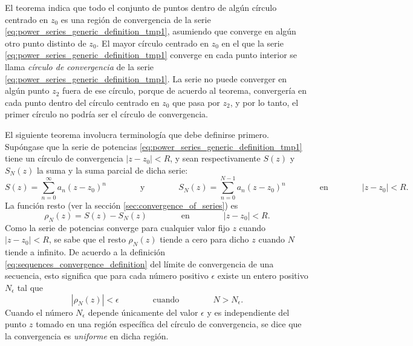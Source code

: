 \documentclass[a4paper]{report}
\begin{document}
El teorema indica que todo el conjunto de puntos dentro de algún círculo centrado en \(z_0\) es una región de convergencia de la serie \ref{eq:power_series_generic_definition_tmp1}, asumiendo que converge en algún otro punto distinto de \(z_0\). El mayor círculo centrado en \(z_0\) en el que la serie \ref{eq:power_series_generic_definition_tmp1} converge en cada punto interior se llama \emph{círculo de convergencia} de la serie \ref{eq:power_series_generic_definition_tmp1}. La serie no puede converger en algún punto \(z_2\) fuera de ese círculo, porque de acuerdo al teorema, convergería en cada punto dentro del círculo centrado en \(z_0\) que pasa por \(z_2\), y por lo tanto, el primer círculo no podría ser el círculo de convergencia.
 
El siguiente teorema involucra terminología que debe definirse primero. Supóngase que la serie de potencias \ref{eq:power_series_generic_definition_tmp1} tiene un círculo de convergencia \(|z-z_0|<R\), y sean respectivamente \(S(z)\) y \(S_N(z)\) la suma y la suma parcial de dicha serie:
\[
 S(z)=\sum_{n=0}^\infty a_n(z-z_0)^n 
 \qquad\qquad\textrm{y}\qquad\qquad
 S_N(z)=\sum_{n=0}^{N-1}a_n(z-z_0)^n
 \qquad\qquad\textrm{en}\qquad\qquad
 |z-z_0|<R.
\]
La función resto (ver la sección \ref{sec:convergence_of_series}) es
\[
 \rho_N(z)=S(z)-S_N(z)
  \qquad\qquad\textrm{en}\qquad\qquad
 |z-z_0|<R.
\]
Como la serie de potencias converge para cualquier valor fijo \(z\) cuando \(|z-z_0|<R\), se sabe que el resto \(\rho_N(z)\) tiende a cero para dicho \(z\) cuando \(N\) tiende a infinito. De acuerdo a la definición \ref{eq:sequences_convergence_definition} del límite de convergencia de una secuencia, esto significa que para cada número positivo \(\epsilon\) existe un entero positivo \(N_\epsilon\) tal que 
\begin{equation}\label{eq:limit_definition_uniform_convergence}
 |\rho_N(z)|<\epsilon
 \qquad\qquad\textrm{cuando}\qquad\qquad
 N>N_\epsilon. 
\end{equation}
Cuando el número \(N_\epsilon\) depende únicamente del valor \(\epsilon\) y es independiente del punto \(z\) tomado en una región específica del círculo de convergencia, se dice que la convergencia es \emph{uniforme} en dicha región.
 
\end{document}
